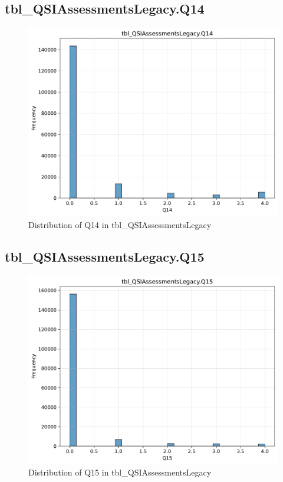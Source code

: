 \subsection{tbl\_QSIAssessmentsLegacy.Q14}

\begin{figure}[htbp]
\centering
\includegraphics[width=\textwidth]{figures/dbo_tbl_QSIAssessmentsLegacy_Q14.pdf}
\caption{Distribution of Q14 in tbl\_QSIAssessmentsLegacy}
\end{figure}\newpage

\subsection{tbl\_QSIAssessmentsLegacy.Q15}

\begin{figure}[htbp]
\centering
\includegraphics[width=\textwidth]{figures/dbo_tbl_QSIAssessmentsLegacy_Q15.pdf}
\caption{Distribution of Q15 in tbl\_QSIAssessmentsLegacy}
\end{figure}\newpage

